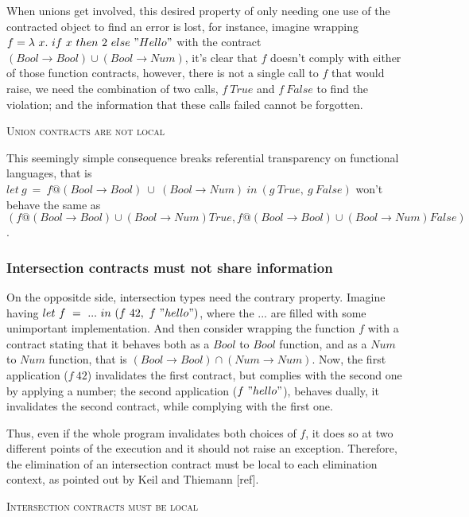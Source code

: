 When unions get involved, this desired property of only needing one
use of the contracted object to find an error is lost,
for instance, imagine wrapping $f = \lambda~x.~if~x~then~2~else~"Hello"$
with the contract $(Bool \rightarrow Bool) \cup (Bool \rightarrow Num)$, it's
clear that $f$ doesn't comply with either of those function contracts, however, there
is not a single call to $f$ that would raise, we need the combination of two calls,
$f~True$ and $f~False$ to find the violation; and the information that these calls failed
cannot be forgotten.

\textsc{Union contracts are not local}


This seemingly simple consequence breaks referential transparency on
functional languages, that is~
$let~g~=~f@(Bool \rightarrow Bool)~\cup~(Bool \rightarrow Num)~in~(g~True,~g~False)$
won't behave the same as 
$(f@(Bool \rightarrow Bool) \cup (Bool \rightarrow Num) True, f@(Bool \rightarrow Bool) \cup (Bool \rightarrow Num) False)$.

\subsubsection*{Intersection contracts must not share information}

On the oppositde side, intersection types need the contrary property.
Imagine having $let~f~=~...~in~(f~42,~f~"hello")$, where the $...$ are filled
with some unimportant implementation. And then consider wrapping the function
$f$ with a contract stating that it behaves both as a $Bool$ to $Bool$ function,
and as a $Num$ to $Num$ function, that is $(Bool \rightarrow Bool) \cap (Num \rightarrow Num)$.
Now, the first application ($f~42$) invalidates the first contract, but complies with the second
one by applying a number; the second application ($f~"hello"$), behaves dually,
it invalidates the second contract,
while complying with the first one.

Thus, even if the whole program invalidates both choices of $f$, it does
so at two different points of the execution and it should not raise an exception.
Therefore, the elimination of an intersection contract must be local to each elimination
context, as pointed out by Keil and Thiemann [ref].

\textsc{Intersection contracts must be local}\\


